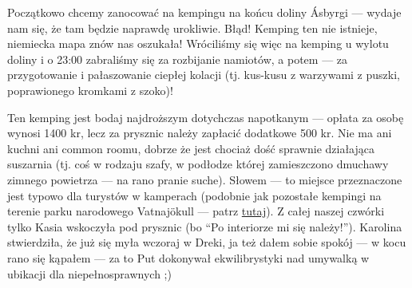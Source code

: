 
Początkowo chcemy zanocować na kempingu na końcu doliny Ásbyrgi --- wydaje nam się, że tam będzie naprawdę urokliwie. Błąd! Kemping ten nie istnieje, niemiecka mapa znów nas oszukała! Wróciliśmy się więc na kemping u wylotu doliny i o 23:00 zabraliśmy się za rozbijanie namiotów, a potem --- za przygotowanie i pałaszowanie ciepłej kolacji (tj. kus-kusu z warzywami z puszki, poprawionego kromkami z szoko)!

Ten kemping jest bodaj najdroższym dotychczas napotkanym --- opłata za osobę wynosi 1400 kr, lecz za prysznic należy zapłacić dodatkowe 500 kr. Nie ma ani kuchni ani common roomu, dobrze że jest chociaż dość sprawnie działająca suszarnia (tj. coś w rodzaju szafy, w podłodze której zamieszczono dmuchawy zimnego powietrza --- na rano pranie suche). Słowem --- to miejsce przeznaczone jest typowo dla turystów w kamperach (podobnie jak pozostałe kempingi na terenie parku narodowego Vatnajökull --- patrz \href{http://www.vatnajokulsthjodgardur.is/english/plan-your-visit/camping/}{tutaj}). Z całej naszej czwórki tylko Kasia wskoczyła pod prysznic (bo “Po interiorze mi się należy!”). Karolina stwierdziła, że już się myła wczoraj  w Dreki, ja też dałem sobie spokój --- w kocu rano się kąpałem --- za to Put dokonywał ekwilibrystyki nad umywalką w ubikacji dla niepełnosprawnych ;)

